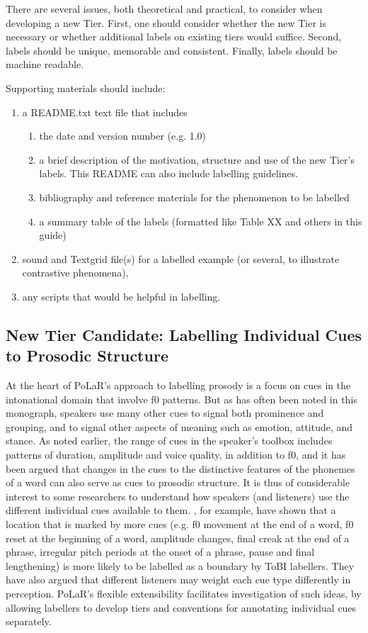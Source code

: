 \documentclass[11pt, twoside]{memoir}
\begin{document}
There are several issues, both theoretical and practical, to consider when developing a new Tier. First, one should consider whether the new Tier is necessary or whether additional labels on existing tiers would suffice. Second, labels should be unique,  memorable and consistent. Finally, labels should be machine readable. 

Supporting materials should include:
\begin{enumerate}
	\item a README.txt text  file that includes
	\begin{enumerate}
		\item the date and version number (e.g. 1.0) 
		\item a brief description of the motivation, structure  and use of the new Tier’s labels. This README can also include labelling guidelines.
		\item bibliography and reference materials for the phenomenon to be labelled
		\item a summary table of the labels (formatted like Table XX and others in this guide)
	\end{enumerate}
	\item sound and Textgrid file(s) for a labelled example (or several, to illustrate contrastive phenomena),
	\item any scripts that would be helpful in labelling. 
\end{enumerate}

\subsection{New Tier Candidate: Labelling Individual Cues to Prosodic Structure}\label{sec:labelling-individual-cues}
At the heart of PoLaR’s approach to labelling prosody is a focus on cues in the intonational domain that involve f0 patterns.  But as has often been noted in this monograph, speakers use many other cues to signal both prominence and grouping, and to signal other aspects of meaning such as emotion, attitude, and stance. As noted earlier, the range of cues in the speaker’s toolbox includes patterns of duration, amplitude and voice quality, in addition to f0, and it has been argued that changes in the cues to the distinctive features of the phonemes of a word can also serve as cues to prosodic structure. It is thus of considerable interest to some researchers to understand how speakers (and listeners) use the different individual cues available to them.  \citet{brugos-18}, for example, have shown that a location that is marked by more cues (e.g. f0 movement at the end of a word, f0 reset at the beginning of a word, amplitude changes, final creak at the end of a phrase, irregular pitch periods at the onset of a phrase, pause and final lengthening) is more likely to be labelled as a boundary by ToBI labellers.  They have also argued that different listeners may weight each cue type differently in perception. PoLaR’s flexible extensibility facilitates investigation of such ideas, by allowing labellers to develop tiers and conventions for annotating individual cues separately. 
\end{document}
